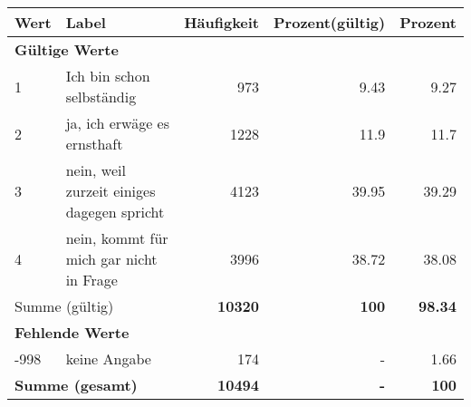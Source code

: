      \begin{longtable}{lXrrr}
     \toprule
     \textbf{Wert} & \textbf{Label} & \textbf{Häufigkeit} & \textbf{Prozent(gültig)} & \textbf{Prozent} \\
     \endhead
     \midrule
     \multicolumn{5}{l}{\textbf{Gültige Werte}}\\

     1 &
     \multicolumn{1}{X}{ Ich bin schon selbständig   } &


       \num{973} &
       \num[round-mode=places,round-precision=2]{9,43} &
         \num[round-mode=places,round-precision=2]{9,27} \\

     2 &
     \multicolumn{1}{X}{ ja, ich erwäge es ernsthaft   } &


       \num{1228} &
       \num[round-mode=places,round-precision=2]{11,9} &
         \num[round-mode=places,round-precision=2]{11,7} \\

     3 &
     \multicolumn{1}{X}{ nein, weil zurzeit einiges dagegen spricht   } &


       \num{4123} &
       \num[round-mode=places,round-precision=2]{39,95} &
         \num[round-mode=places,round-precision=2]{39,29} \\

     4 &
     \multicolumn{1}{X}{ nein, kommt für mich gar nicht in Frage   } &


       \num{3996} &
       \num[round-mode=places,round-precision=2]{38,72} &
         \num[round-mode=places,round-precision=2]{38,08} \\
     \midrule
     \multicolumn{2}{l}{Summe (gültig)} &
       \textbf{\num{10320}} &
     \textbf{100} &
       \textbf{\num[round-mode=places,round-precision=2]{98,34}} \\
     \multicolumn{5}{l}{\textbf{Fehlende Werte}}\\
       -998 &
       keine Angabe &
         \num{174} &
        - &
         \num[round-mode=places,round-precision=2]{1,66} \\
     \midrule
     \multicolumn{2}{l}{\textbf{Summe (gesamt)}} &
          \textbf{\num{10494}} &
        \textbf{-} &
        \textbf{100} \\
     \bottomrule
     \end{longtable}
     
